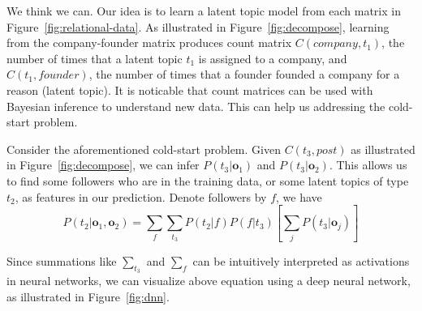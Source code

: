 \documentclass{article}
\newcommand{\V}[1]{\mathbf{#1}}
\begin{document}
We think we can.  Our idea is to learn a latent topic model from each
matrix in Figure~\ref{fig:relational-data}.  As illustrated in
Figure~\ref{fig:decompose}, learning from the company-founder matrix
produces count matrix $C(company,t_1)$, the number of times that a
latent topic $t_1$ is assigned to a company, and $C(t_1,founder)$, the
number of times that a founder founded a company for a reason (latent
topic).  It is noticable that count matrices can be used with Bayesian
inference to understand new data.  This can help us addressing the
cold-start problem.

Consider the aforementioned cold-start problem.  Given $C(t_3,post)$
as illustrated in Figure~\ref{fig:decompose}, we can infer
$P(t_3|\V{o}_1)$ and $P(t_3|\V{o}_2)$.  This allows us to find some
followers who are in the training data, or some latent topics of type
$t_2$, as features in our prediction.  Denote followers by $f$, we
have
%
\begin{equation}
  \label{eq:1}
  P(t_2|\V{o}_1,\V{o}_2) = \sum_f \sum_{t_3}  P(t_2|f) P(f|t_3) \left[ \sum_j P(t_3|\V{o}_j) \right]
\end{equation}

Since summations like $\sum_{t_3}$ and $\sum_{f}$ can be intuitively
interpreted as activations in neural networks, we can visualize above
equation using a deep neural network, as illustrated in
Figure~\ref{fig:dnn}.
\end{document}
